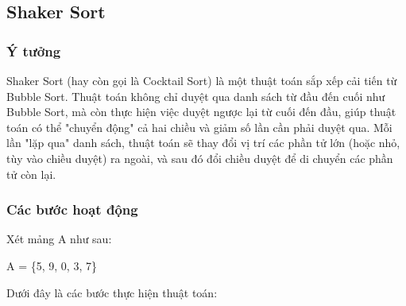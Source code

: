 \subsection{Shaker Sort}
\label{subsec:shaker-sort}

\subsubsection{Ý tưởng}
Shaker Sort (hay còn gọi là Cocktail Sort) là một thuật toán sắp xếp cải tiến từ Bubble Sort. Thuật toán không chỉ duyệt qua danh sách từ đầu đến cuối như Bubble Sort, mà còn thực hiện việc duyệt ngược lại từ cuối đến đầu, giúp thuật toán có thể "chuyển động" cả hai chiều và giảm số lần cần phải duyệt qua. Mỗi lần "lặp qua" danh sách, thuật toán sẽ thay đổi vị trí các phần tử lớn (hoặc nhỏ, tùy vào chiều duyệt) ra ngoài, và sau đó đổi chiều duyệt để di chuyển các phần tử còn lại.

\subsubsection{Các bước hoạt động}
Xét mảng A như sau: 
\begin{center}
   A = \{5, 9, 0, 3, 7\} 
\end{center} 
Dưới đây là các bước thực hiện thuật toán:


